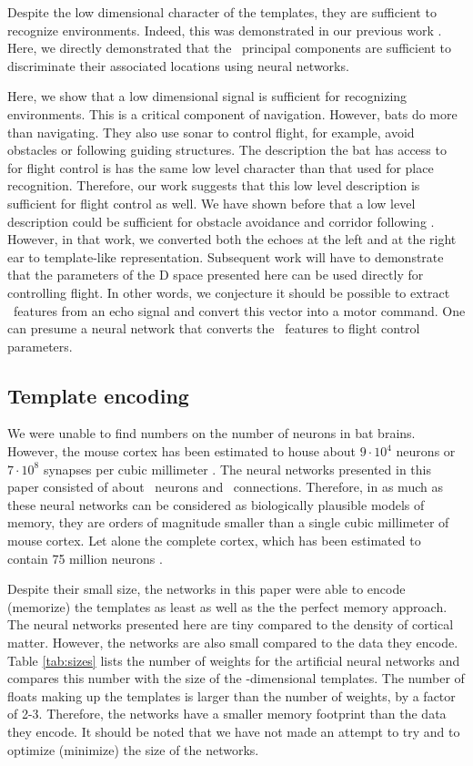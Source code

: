 \documentclass[preprint,5p]{elsarticle}
\begin{document}
Despite the low dimensional character of the templates, they are sufficient to recognize environments. Indeed, this was demonstrated in our previous work \citep{Vanderelst2016}. Here, we directly demonstrated that the  \pca\ principal components are sufficient to discriminate their associated locations using neural networks.

Here, we show that a low dimensional signal is sufficient for recognizing environments. This is a critical component of navigation. However, bats do more than navigating. They also use sonar to control flight, for example, avoid obstacles or following guiding structures. The description the bat has access to for flight control is has the same low level character than that used for place recognition. Therefore, our work suggests that this low level description is sufficient for flight control as well. We have shown before that a low level description could be sufficient for obstacle avoidance and corridor following \citep{Vanderelst2015a,Mansour2019}. However, in that work, we converted both the echoes at the left and at the right ear to template-like representation. Subsequent work will have to demonstrate that the parameters of the \pca D space presented here can be used directly for controlling flight. In other words, we conjecture it should be possible to extract \pca\ features from an echo signal and convert this vector into a motor command. One can presume a neural network that converts the \pca\ features to flight control parameters.

\subsection{Template encoding}

We were unable to find numbers on the number of neurons in bat brains. However, the mouse cortex has been estimated to house about $9 \cdot 10^4$ neurons or $7 \cdot 10^8$ synapses per cubic millimeter \citep{Braitenberg2013}. The neural networks presented in this paper consisted of about \nneurons\ neurons and \nweights\ connections. Therefore, in as much as these neural networks can be considered as biologically plausible models of memory, they are orders of magnitude smaller than a single cubic millimeter of mouse cortex. Let alone the complete cortex, which has been estimated to contain 75 million neurons \citep{Williams2000}. 

Despite their small size, the networks in this paper were able to encode (memorize) the templates as least as well as the the perfect memory approach. The neural networks presented here are tiny compared to the density of cortical matter. However, the networks are also small compared to the data they encode. Table \ref{tab:sizes} lists the number of weights for the artificial neural networks and compares this number with the size of the \pca-dimensional templates. The number of floats making up the templates is larger than the number of weights, by a factor of 2-3. Therefore, the networks have a smaller memory footprint than the data they encode. It should be noted that we have not made an attempt to try and to optimize (minimize) the size of the networks.
\end{document}

